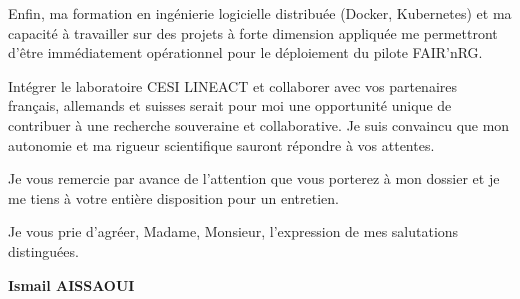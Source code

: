 \documentclass[a4paper,12pt]{article}
\begin{document}
Enfin, ma formation en ingénierie logicielle distribuée (Docker, Kubernetes) et ma capacité à travailler sur des projets à forte dimension appliquée me permettront d'être immédiatement opérationnel pour le déploiement du pilote FAIR'nRG.

Intégrer le laboratoire CESI LINEACT et collaborer avec vos partenaires français, allemands et suisses serait pour moi une opportunité unique de contribuer à une recherche souveraine et collaborative. Je suis convaincu que mon autonomie et ma rigueur scientifique sauront répondre à vos attentes.

Je vous remercie par avance de l'attention que vous porterez à mon dossier et je me tiens à votre entière disposition pour un entretien.

Je vous prie d'agréer, Madame, Monsieur, l'expression de mes salutations distinguées.

\bigskip

\begin{flushright}
    \textbf{Ismail AISSAOUI}
\end{flushright}
\end{document}
